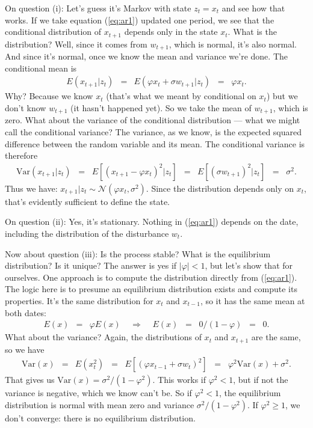 \documentclass[11pt]{article}
\begin{document}
On question (i): Let's guess it's Markov with state $z_t = x_t$ and see how that works.
If we take equation (\ref{eq:ar1}) updated one period,
we see that the conditional distribution of $x_{t+1}$ depends only in the state $x_t$.
What is the distribution?  Well, since
it comes from $w_{t+1}$, which is normal, it's also normal.
And since it's normal, once we know the mean and variance we're done.
The conditional mean is
\begin{eqnarray*}
    E ( x_{t+1} | z_t )
            &=& E (\varphi x_t + \sigma w_{t+1} | z_t )
                \;\;=\;\; \varphi x_t .
\end{eqnarray*}
Why?  Because we know $x_t$ (that's what we meant by conditional on $x_t$)
but we don't know $w_{t+1}$ (it hasn't happened yet).
So we take the mean of $w_{t+1}$, which is zero.
What about the variance of the conditional distribution --- what we might call the conditional variance?
The variance, as we know,
 is the expected squared difference between the random variable and its mean.
The conditional variance is therefore
\begin{eqnarray*}
    \mbox{Var}(x_{t+1} | z_t ) \;\;=\;\;
    E \left[(x_{t+1} - \varphi x_t)^2 | z_t \right]
            &=& E \left[(\sigma w_{t+1})^2 | z_t \right]
                \;\;=\;\; \sigma^2 .
\end{eqnarray*}
Thus we have:  $x_{t+1} | z_t \sim \mathcal{N} (\varphi x_t, \sigma^2)$.
Since the distribution depends only on $x_t$, that's evidently sufficient to define the state.

On question (ii):  Yes, it's stationary.
Nothing in (\ref{eq:ar1}) depends on the date, including the distribution
of the disturbance $w_t$.


Now about question (iii):  Is the process stable?
What is the equilibrium distribution?
Is it unique?
The answer is yes if $|\varphi| < 1$, but let's show that for ourselves.
One approach is to compute the distribution directly
from (\ref{eq:ar1}).
The logic here is to presume an equilibrium distribution exists and
compute its properties.
It's the same distribution for $x_t$ and $x_{t-1}$,
so it has the same mean at both dates:
\begin{eqnarray*}
    E( x ) &=& \varphi E(x) \;\;\;\;\Rightarrow\;\;\;\; E(x)
        \;\;=\;\; 0/(1-\varphi) \;\;=\;\; 0 .
\end{eqnarray*}
What about the variance?
Again, the distributions of $x_t$ and $x_{t+1}$ are the same,
so we have
\begin{eqnarray*}
    \mbox{Var}(x) &=& E (x_{t}^2)
            \;\;=\;\; E \left[ (\varphi x_{t-1} + \sigma w_{t})^2 \right]
            \;\;=\;\; \varphi^2 \mbox{Var}(x) + \sigma^2.
\end{eqnarray*}
That gives us $\mbox{Var}(x) = \sigma^2 /(1-\varphi^2)$.
This works if $\varphi^2 < 1$,
but if not the variance is negative, which
we know can't be.  So if $ \varphi^2<1$, the
equilibrium distribution is normal with mean zero
and variance $ \sigma^2/(1-\varphi^2)$.
If $\varphi^2 \geq 1$, we don't converge:  there is no equilibrium distribution.
\end{document}
